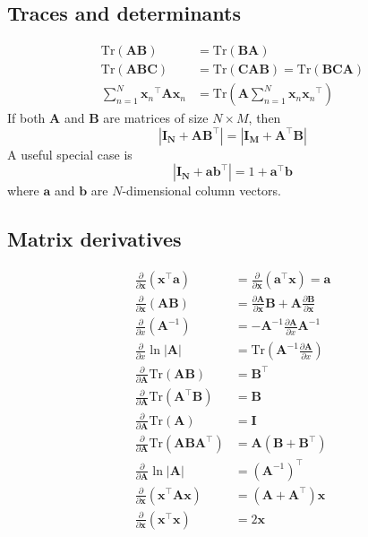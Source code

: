 \documentclass[a4paper]{book}
\newcommand{\up}{\mathrm}
\renewcommand{\bf}{\mathbf}
\begin{document}
\subsection{Traces and determinants}
\begin{align}
	\up{Tr}(\bf{AB}) &= \up{Tr}(\bf{BA}) \\
	\up{Tr}(\bf{ABC}) &= \up{Tr}(\bf{CAB}) = \up{Tr}(\bf{BCA})	\\
		\sum_{n=1}^{N} {\bf{x}_n}^{\intercal} \bf{A} \bf{x}_n &= \up{Tr}(\bf{A} \sum_{n=1}^{N} \bf{x}_n{\bf{x}_n}^{\intercal})
\end{align}
If both $\bf{A}$ and $\bf{B}$ are matrices of size $N \times M$, then
\begin{equation}
	|\bf{I_N+AB^{\intercal}}|=|\bf{I_M+A^{\intercal}B}|
\end{equation}
A useful special case is
\begin{equation}
	|\bf{I_N+ab^{\intercal}}|=1+\bf{a^{\intercal}b} \label{ide2}
\end{equation}
where $\bf{a}$ and $\bf{b}$ are $N$-dimensional column vectors.
\subsection{Matrix derivatives}
\begin{align}
	\frac{\partial}{\partial \bf{x}}(\bf{x}^{\intercal}\bf{a})&=\frac{\partial}{\partial \bf{x}}(\bf{a}^{\intercal}\bf{x})=\bf{a}\\
	\frac{\partial}{\partial \bf{x}}(\bf{AB}) &= \frac{\partial\bf{A}}{\partial \bf{x}}\bf{B} + \bf{A} \frac{\partial \bf{B}}{\partial \bf{x}}\\
	\frac{\partial}{\partial x}(\bf{A}^{-1})&=-\bf{A}^{-1}\frac{\partial \bf{A}}{\partial x}\bf{A}^{-1}\\
	\frac{\partial}{\partial x}\ln|\bf{A}| &= \up{Tr}\left(\bf{A}^{-1}\frac{\partial \bf{A}}{\partial x}\right)\\
	\frac{\partial}{\partial \bf{A}} \up{Tr}(\bf{AB}) &= \bf{B}^{\intercal}\\
	\frac{\partial}{\partial \bf{A}}\up{Tr}(\bf{A}^{\intercal}\bf{B})&= \bf{B}\\
	\frac{\partial}{\partial \bf{A}} \up{Tr}(\bf{A}) &= \bf{I }\\
	\frac{\partial}{\partial \bf{A}}\up{Tr}(\bf{ABA}^{\intercal}) &= \bf{A(B+B^{\intercal})}\\
	\frac{\partial}{\partial \bf{A}} \ln|\bf{A}| &= (\bf{A}^{-1})^{\intercal}\\
	\frac{\partial}{\partial \bf{x}}(\bf{x}^{\intercal}\bf{A}\bf{x}) &= (\bf{A+A}^{\intercal})\bf{x}\\
	\frac{\partial}{\partial \bf{x}}(\bf{x}^{\intercal}\bf{x}) &= 2\bf{x}
\end{align}
\end{document}
